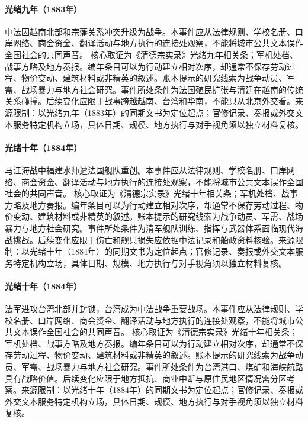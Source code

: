 \hypertarget{civic:EQ-1883-SINO-FRENCH-WAR-BEGIN}{}\paragraph{光绪九年（1883年）}中法因越南北部和宗藩关系冲突升级为战争。本事件应从法律规则、学校名册、口岸网络、商会资金、翻译活动与地方执行的连接处观察，不能将城市公共文本误作全国社会的共同声音。 核心取证为《清德宗实录》光绪九年相关条；军机处档、战事方略及地方奏报。编年条目可以为行动建立相对次序，却通常不保存劳动过程、物价变动、建筑材料或非精英的叙述。账本提示的研究线索为战争动员、军需、战场暴力与地方社会研究。事件所处条件为法国殖民扩张与清廷在越南的传统关系碰撞。后续变化应限于战事跨越越南、台湾和华南，不能只从北京外交看。来源限制：以光绪九年（1883年）的同期文书为定位起点；官修记录、奏报或外交文本服务特定机构立场，具体日期、规模、地方执行与对手视角须以独立材料复核。
\hypertarget{civic:EQ-1884-FUZHOU-NAVAL-BATTLE}{}\paragraph{光绪十年（1884年）}马江海战中福建水师遭法国舰队重创。本事件应从法律规则、学校名册、口岸网络、商会资金、翻译活动与地方执行的连接处观察，不能将城市公共文本误作全国社会的共同声音。 核心取证为《清德宗实录》光绪十年相关条；军机处档、战事方略及地方奏报。编年条目可以为行动建立相对次序，却通常不保存劳动过程、物价变动、建筑材料或非精英的叙述。账本提示的研究线索为战争动员、军需、战场暴力与地方社会研究。事件所处条件为清军舰队训练、指挥与武器体系面临现代海战挑战。后续变化应限于伤亡和舰只损失应依据中法记录和船政资料核验。来源限制：以光绪十年（1884年）的同期文书为定位起点；官修记录、奏报或外交文本服务特定机构立场，具体日期、规模、地方执行与对手视角须以独立材料复核。
\hypertarget{civic:EQ-1884-TAIWAN-BLOCKADE}{}\paragraph{光绪十年（1884年）}法军进攻台湾北部并封锁，台湾成为中法战争重要战场。本事件应从法律规则、学校名册、口岸网络、商会资金、翻译活动与地方执行的连接处观察，不能将城市公共文本误作全国社会的共同声音。 核心取证为《清德宗实录》光绪十年相关条；军机处档、战事方略及地方奏报。编年条目可以为行动建立相对次序，却通常不保存劳动过程、物价变动、建筑材料或非精英的叙述。账本提示的研究线索为战争动员、军需、战场暴力与地方社会研究。事件所处条件为台湾港口、煤矿和海峡航路具有战略价值。后续变化应限于地方抵抗、商业中断与原住民地区情况需分区考察。来源限制：以光绪十年（1884年）的同期文书为定位起点；官修记录、奏报或外交文本服务特定机构立场，具体日期、规模、地方执行与对手视角须以独立材料复核。
